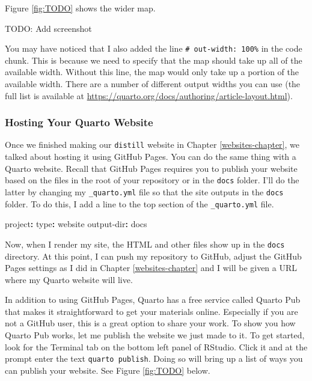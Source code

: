 \documentclass[
]{book}
\newenvironment{Shaded}{\begin{snugshade}}{\end{snugshade}}
\newcommand{\AttributeTok}[1]{\textcolor[rgb]{0.77,0.63,0.00}{#1}}
\newcommand{\FunctionTok}[1]{\textcolor[rgb]{0.00,0.00,0.00}{#1}}
\newcommand{\KeywordTok}[1]{\textcolor[rgb]{0.13,0.29,0.53}{\textbf{#1}}}
\begin{document}
Figure \ref{fig:TODO} shows the wider map.

TODO: Add screenshot

You may have noticed that I also added the line \texttt{\#\textbar{}\ out-width:\ 100\%} in the code chunk. This is because we need to specify that the map should take up all of the available width. Without this line, the map would only take up a portion of the available width. There are a number of different output widths you can use (the full list is available at \url{https://quarto.org/docs/authoring/article-layout.html}).

\hypertarget{hosting-your-quarto-website}{%
\subsubsection*{Hosting Your Quarto Website}\label{hosting-your-quarto-website}}

Once we finished making our \texttt{distill} website in Chapter \ref{websites-chapter}, we talked about hosting it using GitHub Pages. You can do the same thing with a Quarto website. Recall that GitHub Pages requires you to publish your website based on the files in the root of your repository or in the \texttt{docs} folder. I'll do the latter by changing my \texttt{\_quarto.yml} file so that the site outputs in the \texttt{docs} folder. To do this, I add a line to the top section of the \texttt{\_quarto.yml} file.

\begin{Shaded}
\begin{Highlighting}[]
\FunctionTok{project}\KeywordTok{:}
\AttributeTok{  }\FunctionTok{type}\KeywordTok{:}\AttributeTok{ website}
\AttributeTok{  }\FunctionTok{output{-}dir}\KeywordTok{:}\AttributeTok{ docs}
\end{Highlighting}
\end{Shaded}

Now, when I render my site, the HTML and other files show up in the \texttt{docs} directory. At this point, I can push my repository to GitHub, adjust the GitHub Pages settings as I did in Chapter \ref{websites-chapter} and I will be given a URL where my Quarto website will live.

In addition to using GitHub Pages, Quarto has a free service called Quarto Pub that makes it straightforward to get your materials online. Especially if you are not a GitHub user, this is a great option to share your work. To show you how Quarto Pub works, let me publish the website we just made to it. To get started, look for the Terminal tab on the bottom left panel of RStudio. Click it and at the prompt enter the text \texttt{quarto\ publish}. Doing so will bring up a list of ways you can publish your website. See Figure \ref{fig:TODO} below.
\end{document}
